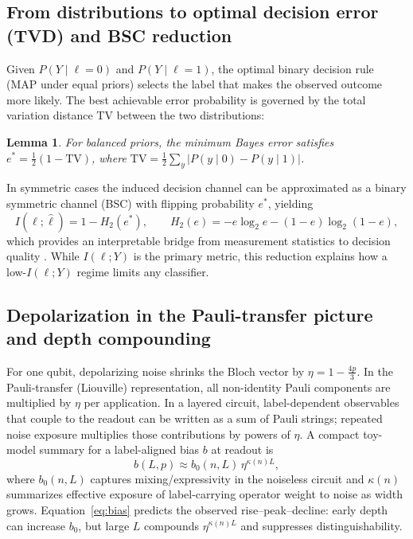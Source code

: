 \documentclass[journal]{IEEEtran}
\newtheorem{lemma}{Lemma}
\newcommand{\MI}{I(\ell;Y)}
\newcommand{\Htwo}{H_2}
\newcommand{\TV}{\mathrm{TV}}
\begin{document}
\subsection{From distributions to optimal decision error (TVD) and BSC reduction}
Given $P(Y\mid \ell=0)$ and $P(Y\mid \ell=1)$, the optimal binary decision rule (MAP under equal priors) selects the label that makes the observed outcome more likely. The best achievable error probability is governed by the total variation distance $\TV$ between the two distributions:
\begin{lemma}
For balanced priors, the minimum Bayes error satisfies $e^{\ast}=\tfrac{1}{2}(1-\TV)$, where $\TV=\tfrac{1}{2}\sum_y |P(y\mid 0)-P(y\mid 1)|$.
\end{lemma}
In symmetric cases the induced decision channel can be approximated as a binary symmetric channel (BSC) with flipping probability $e^{\ast}$, yielding
\begin{equation}
I(\ell;\hat{\ell}) = 1-\Htwo(e^{\ast}),\qquad 
\Htwo(e)=-e\log_2 e -(1-e)\log_2(1-e),
\end{equation}
which provides an interpretable bridge from measurement statistics to decision quality \cite{ref3}. While $\MI$ is the primary metric, this reduction explains how a low-$\MI$ regime limits any classifier.

\subsection{Depolarization in the Pauli-transfer picture and depth compounding}
For one qubit, depolarizing noise shrinks the Bloch vector by $\eta=1-\tfrac{4p}{3}$. In the Pauli-transfer (Liouville) representation, all non-identity Pauli components are multiplied by $\eta$ per application. In a layered circuit, label-dependent observables that couple to the readout can be written as a sum of Pauli strings; repeated noise exposure multiplies those contributions by powers of $\eta$. A compact toy-model summary for a label-aligned bias $b$ at readout is
\begin{equation}
b(L,p)\approx b_0(n,L)\,\eta^{\kappa(n)L},
\label{eq:bias}
\end{equation}
where $b_0(n,L)$ captures mixing/expressivity in the noiseless circuit and $\kappa(n)$ summarizes effective exposure of label-carrying operator weight to noise as width grows. Equation~\eqref{eq:bias} predicts the observed rise--peak--decline: early depth can increase $b_0$, but large $L$ compounds $\eta^{\kappa(n)L}$ and suppresses distinguishability.
\end{document}
